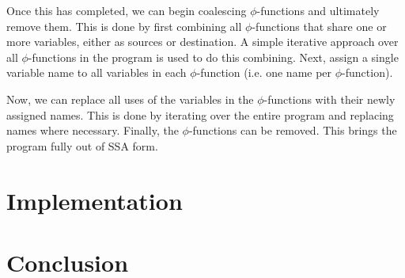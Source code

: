 \documentclass[a4paper,10pt]{report}
\begin{document}
Once this has completed, we can begin coalescing \(\phi\)-functions and ultimately remove them. This is done by first combining
all \(\phi\)-functions that share one or more variables, either as sources or destination. A simple iterative approach over all 
\(\phi\)-functions in the program is used to do this combining. Next, assign a single variable name to all variables in each 
\(\phi\)-function (i.e. one name per \(\phi\)-function). 

Now, we can replace all uses of the variables in the \(\phi\)-functions with their newly assigned names. This is done by iterating
over the entire program and replacing names where necessary. Finally, the \(\phi\)-functions can be removed. This brings the program
fully out of SSA form.

\chapter{Implementation}


\chapter{Conclusion}
\end{document}
